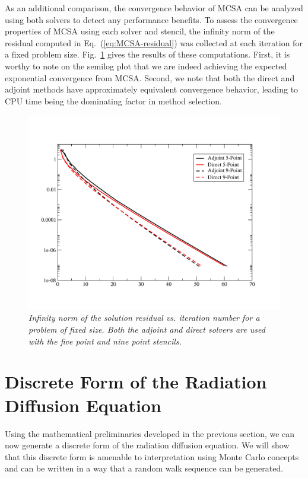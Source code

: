 \documentclass[preprint,12pt]{elsarticle}
\begin{document}
As an additional comparison, the convergence behavior of MCSA can be analyzed
using both solvers to detect any performance benefits. To assess the
convergence properties of MCSA using each solver and stencil, the infinity
norm of the residual computed in Eq.~(\ref{eq:MCSA-residual}) was collected at
each iteration for a fixed problem size. Fig.~\ref{fig:poisson_convergence}
gives the results of these computations. First, it is worthy to note on the
semilog plot that we are indeed achieving the expected exponential convergence
from MCSA. Second, we note that both the direct and adjoint methods have
approximately equivalent convergence behavior, leading to CPU time being the
dominating factor in method selection.
\begin{figure}[h!]
  \centering
  \includegraphics[width=5in,clip]{Adjoint_Direct_Convergence.pdf}
  \caption{\sl Infinity norm of the solution residual vs. iteration
    number for a problem of fixed size. Both the adjoint and direct
    solvers are used with the five point and nine point stencils.}
  \label{fig:poisson_convergence}
\end{figure}

\section{Discrete Form of the Radiation Diffusion Equation}
\label{sec:discr-form-radi}

Using the mathematical preliminaries developed in the previous section, we can
now generate a discrete form of the radiation diffusion equation. We will show
that this discrete form is amenable to interpretation using Monte Carlo
concepts and can be written in a way that a random walk sequence can be
generated.
\end{document}
